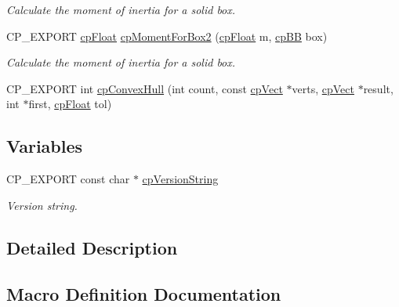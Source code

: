 \begin{DoxyCompactItemize}
\begin{DoxyCompactList}\small\item\em Calculate the moment of inertia for a solid box. \end{DoxyCompactList}\item 
\mbox{\label{group__misc_ga4a01a4b99c3976c1a9b4df14efe04552}} 
C\+P\+\_\+\+E\+X\+P\+O\+RT \mbox{\hyperlink{group__basic_types_gac1ed65573e035bf892505768c852d8d3}{cp\+Float}} \mbox{\hyperlink{group__misc_ga4a01a4b99c3976c1a9b4df14efe04552}{cp\+Moment\+For\+Box2}} (\mbox{\hyperlink{group__basic_types_gac1ed65573e035bf892505768c852d8d3}{cp\+Float}} m, \mbox{\hyperlink{structcp_b_b}{cp\+BB}} box)
\begin{DoxyCompactList}\small\item\em Calculate the moment of inertia for a solid box. \end{DoxyCompactList}\item 
C\+P\+\_\+\+E\+X\+P\+O\+RT int \mbox{\hyperlink{group__misc_ga94ed1fc4d2c987c3e4df3cb16b12a156}{cp\+Convex\+Hull}} (int count, const \mbox{\hyperlink{structcp_vect}{cp\+Vect}} $\ast$verts, \mbox{\hyperlink{structcp_vect}{cp\+Vect}} $\ast$result, int $\ast$first, \mbox{\hyperlink{group__basic_types_gac1ed65573e035bf892505768c852d8d3}{cp\+Float}} tol)
\end{DoxyCompactItemize}
\subsection*{Variables}
\begin{DoxyCompactItemize}
\item 
\mbox{\label{group__misc_ga421f2f17b14cd75176f18c0a85074a8c}} 
C\+P\+\_\+\+E\+X\+P\+O\+RT const char $\ast$ \mbox{\hyperlink{group__misc_ga421f2f17b14cd75176f18c0a85074a8c}{cp\+Version\+String}}
\begin{DoxyCompactList}\small\item\em Version string. \end{DoxyCompactList}\end{DoxyCompactItemize}


\subsection{Detailed Description}


\subsection{Macro Definition Documentation}
\mbox{\label{group__misc_ga9abe29a1fe6d1f2041e95f2fb2e2ce1c}} 

